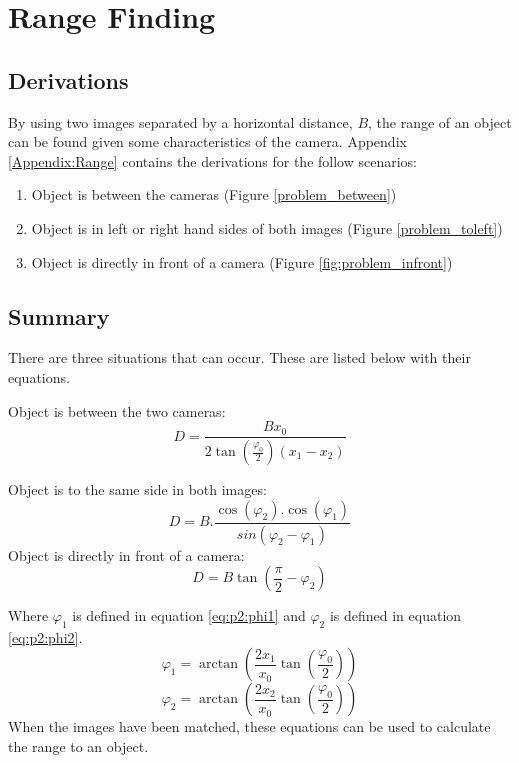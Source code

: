 \section{Range Finding}
\subsection{Derivations}

By using two images separated by a horizontal distance, $B$, the range of an object can be found given some characteristics of the camera. Appendix \ref{Appendix:Range} contains the derivations for the follow scenarios:

\begin{enumerate}
\item Object is between the cameras (Figure \ref{problem_between})
\item Object is in left or right hand sides of both images (Figure \ref{problem_toleft})
\item Object is directly in front of a camera (Figure \ref{fig:problem_infront})
\end{enumerate}


\subsection{Summary}
There are three situations that can occur. These are listed below with their equations.

Object is between the two cameras:
\begin{equation} \label{eq:summary:1}
D = \frac{Bx_0}{2\tan(\frac{\varphi_0}{2})(x_1 - x_2)}
\end{equation}

Object is to the same side in both images:
\begin{equation} \label{eq:summary:2}
D = B.\frac{\cos(\varphi_2).\cos(\varphi_1)}{sin(\varphi_2 - \varphi_1)}
\end{equation}
Object is directly in front of a camera:
\begin{equation} \label{eq:summary:3}
D = B \tan\left(\frac{\pi}{2} - \varphi_{2}\right)
\end{equation}

Where $\varphi_1$ is defined in equation \eqref{eq:p2:phi1} and $\varphi_2$ is defined in equation \eqref{eq:p2:phi2}.
\begin{equation} \label{eq:p2:phi1}
\varphi_1 = \arctan\left(\frac{2x_1}{x_0}\tan\left(\frac{\varphi_0}{2}\right)\right)
\end{equation}
\begin{equation} \label{eq:p2:phi2}
\varphi_2 = \arctan\left(\frac{2x_2}{x_0}\tan\left(\frac{\varphi_0}{2}\right)\right)
\end{equation}
When the images have been matched, these equations can be used to calculate the range to an object.

